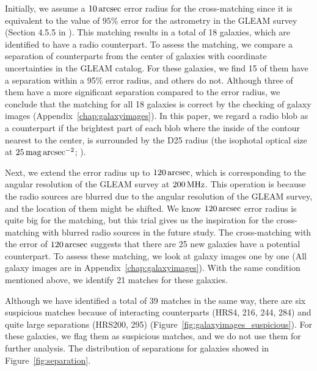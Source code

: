 Initially, we assume a $10\,\mathrm{arcsec}$ error radius for the cross-matching since it is equivalent to the value of $95\%$ error for the astrometry in the GLEAM survey (Section 4.5.5 in \citealt{Hurley-Walker2017a}).
This matching results in a total of 18 galaxies, which are identified to have a radio counterpart.
To assess the matching, we compare a separation of counterparts from the center of galaxies with coordinate uncertainties in the GLEAM catalog.
For these galaxies, we find 15 of them have a separation within a 95\% error radius, and others do not.
Although three of them have a more significant separation compared to the error radius, we conclude that the matching for all 18 galaxies is correct by the checking of galaxy images (Appendix~\ref{chap:galaxyimages}).
In this paper, we regard a radio blob as a counterpart if the brightest part of each blob where the inside of the contour nearest to the center, is surrounded by the D25 radius (the isophotal optical size at $25\,\mathrm{mag}\,\mathrm{arcsec}^{-2}$; \citealt{Boselli2010}).

Next, we extend the error radius up to $120\,\mathrm{arcsec}$, which is corresponding to the angular resolution of the GLEAM survey at $200\,\mathrm{MHz}$.
This operation is because the radio sources are blurred due to the angular resolution of the GLEAM survey, and the location of them might be shifted.
We know $120\,\mathrm{arcsec}$ error radius is quite big for the matching, but this trial gives us the inspiration for the cross-matching with blurred radio sources in the future study.
The cross-matching with the error of $120\,\mathrm{arcsec}$ suggests that there are 25 new galaxies have a potential counterpart.
To assess these matching, we look at galaxy images one by one (All galaxy images are in Appendix~\ref{chap:galaxyimages}).
With the same condition mentioned above, we identify 21 matches for these galaxies.

Although we have identified a total of 39 matches in the same way, there are six suspicious matches because of interacting counterparts (HRS4, 216, 244, 284) and quite large separations (HRS200, 295) (Figure~\ref{fig:galaxyimages_suspicious}).
For these galaxies, we flag them as suspicious matches, and we do not use them for further analysis.
The distribution of separations for galaxies showed in Figure~\ref{fig:separation}.

